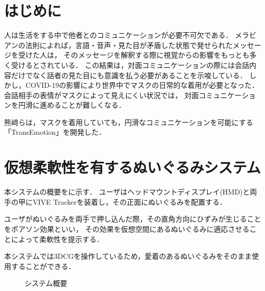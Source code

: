 \documentclass[uplatex]{jsarticle}   %
\begin{document}

\vspace{3mm}

\setcounter{page}{1}



\section{はじめに}
人は生活をする中で他者とのコミュニケーションが必要不可欠である．
メラビアンの法則によれば，言語・音声・見た目が矛盾した状態で発せられたメッセージを受けた人は，
そのメッセージを解釈する際に視覚からの影響をもっとも多く受けるとされている．
この結果は，対面コミュニケーションの際には会話内容だけでなく話者の見た目にも意識を払う必要があることを示唆している．
しかし，COVID-19の影響により世界中でマスクの日常的な着用が必要となった．会話相手の表情がマスクによって見えにくい状況では，
対面コミュニケーションを円滑に進めることが難しくなる．

熊﨑らは，マスクを着用していても，円滑なコミュニケーションを可能にする「TransEmotion」を開発した\cite{TransEmotion}．


\section{仮想柔軟性を有するぬいぐるみシステム}
本システムの概要をに示す．
ユーザはヘッドマウントディスプレイ(HMD)と両手の甲にVIVE Trackerを装着し，その正面にぬいぐるみを配置する．

ユーザがぬいぐるみを両手で押し込んだ際，その直角方向にひずみが生じることをポアソン効果といい，
その効果を仮想空間にあるぬいぐるみに適応させることによって柔軟性を提示する．

本システムでは3DCGを操作しているため，愛着のあるぬいぐるみをそのまま使用することができる．

\begin{figure}[t]
    \centering
    \caption{システム概要}\label{fig:gaiyou}
\end{figure}
\end{document}
